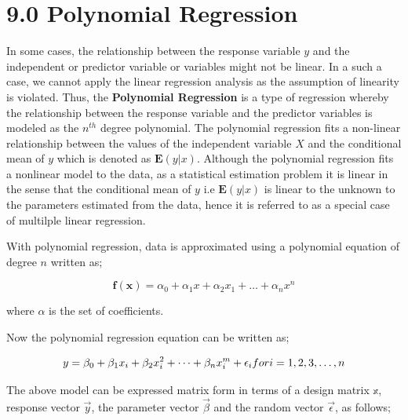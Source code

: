 \documentclass[
]{article}
\begin{document}
\newpage

\hypertarget{polynomial-regression}{%
\section{9.0 Polynomial Regression}\label{polynomial-regression}}

In some cases, the relationship between the response variable \(y\) and
the independent or predictor variable or variables might not be linear.
In a such a case, we cannot apply the linear regression analysis as the
assumption of linearity is violated. Thus, the \textbf{Polynomial
Regression} is a type of regression whereby the relationship between the
response variable and the predictor variables is modeled as the
\(n^{th}\) degree polynomial. The polynomial regression fits a
non-linear relationship between the values of the independent variable
\(X\) and the conditional mean of \(y\) which is denoted as
\(\mathbf{E}(y|x)\). Although the polynomial regression fits a nonlinear
model to the data, as a statistical estimation problem it is linear in
the sense that the conditional mean of \(y\) i.e \(\mathbf{E}(y|x)\) is
linear to the unknown to the parameters estimated from the data, hence
it is referred to as a special case of multilple linear regression.

With polynomial regression, data is approximated using a polynomial
equation of degree \(n\) written as;

\[\mathbf{f(x)}=\alpha_0+\alpha_1x+\alpha_2x_1+\dots+\alpha_nx^n\]

where \(\alpha\) is the set of coefficients.

Now the polynomial regression equation can be written as;

\[y=\beta_0+\beta_1x_i+\beta_2x_i^2+\dots+\beta_nx_i^m+\epsilon_i \\for\space i=1,2,3,\dots,n\]

The above model can be expressed matrix form in terms of a design matrix
\(\mathbb{x}\), response vector \(\vec{y}\), the parameter vector
\(\vec{\beta}\) and the random vector \(\vec{\epsilon }\), as follows;
\end{document}
